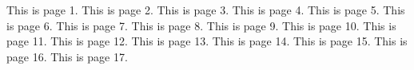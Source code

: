 
\nofiles



\Huge

This is page 1.\newpage
This is page 2.\newpage
This is page 3.\newpage
This is page 4.\newpage
This is page 5.\newpage
This is page 6.\newpage
This is page 7.\newpage
This is page 8.\newpage
This is page 9.\newpage
This is page 10.\newpage
This is page 11.\newpage
This is page 12.\newpage
This is page 13.\newpage
This is page 14.\newpage
This is page 15.\newpage
This is page 16.\newpage
This is page 17.\newpage



